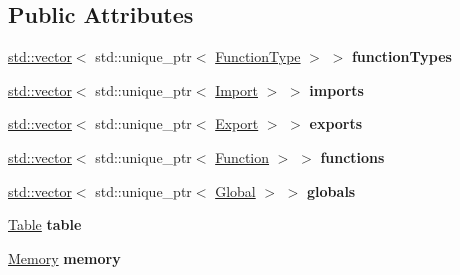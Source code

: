 \subsection*{Public Attributes}
\begin{DoxyCompactItemize}
\item 
\mbox{\label{classwasm_1_1_module_a661b07ab6199365ab1d372c16529ea77}} 
\mbox{\hyperlink{classstd_1_1vector}{std\+::vector}}$<$ std\+::unique\+\_\+ptr$<$ \mbox{\hyperlink{classwasm_1_1_function_type}{Function\+Type}} $>$ $>$ {\bfseries function\+Types}
\item 
\mbox{\label{classwasm_1_1_module_ac059b6a0b3817c22bea87ce6a740dd4f}} 
\mbox{\hyperlink{classstd_1_1vector}{std\+::vector}}$<$ std\+::unique\+\_\+ptr$<$ \mbox{\hyperlink{classwasm_1_1_import}{Import}} $>$ $>$ {\bfseries imports}
\item 
\mbox{\label{classwasm_1_1_module_acc81d60160da41e12ebb68d5cfc5b6c0}} 
\mbox{\hyperlink{classstd_1_1vector}{std\+::vector}}$<$ std\+::unique\+\_\+ptr$<$ \mbox{\hyperlink{classwasm_1_1_export}{Export}} $>$ $>$ {\bfseries exports}
\item 
\mbox{\label{classwasm_1_1_module_aaa0bf3f72e2c1eb9f8f234bf02b5d4ac}} 
\mbox{\hyperlink{classstd_1_1vector}{std\+::vector}}$<$ std\+::unique\+\_\+ptr$<$ \mbox{\hyperlink{classwasm_1_1_function}{Function}} $>$ $>$ {\bfseries functions}
\item 
\mbox{\label{classwasm_1_1_module_aab10c823b4bf7b823746d3b67a029f24}} 
\mbox{\hyperlink{classstd_1_1vector}{std\+::vector}}$<$ std\+::unique\+\_\+ptr$<$ \mbox{\hyperlink{classwasm_1_1_global}{Global}} $>$ $>$ {\bfseries globals}
\item 
\mbox{\label{classwasm_1_1_module_ac7b7058d88df46982338b06bd991645e}} 
\mbox{\hyperlink{classwasm_1_1_table}{Table}} {\bfseries table}
\item 
\mbox{\label{classwasm_1_1_module_a8d622d7a2f07d48910431e056228062e}} 
\mbox{\hyperlink{classwasm_1_1_memory}{Memory}} {\bfseries memory}
\item 
\mbox{\label{classwasm_1_1_module_abbfc1790f88839a307da3af3e459b92d}} 

\end{DoxyCompactItemize}
